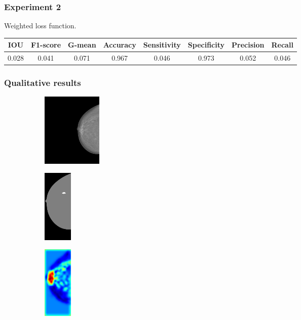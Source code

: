 \documentclass{beamer}
\begin{document}
	\begin{frame}
		\frametitle{Experiment 2}
		Weighted loss function.
		
		\scriptsize
		\begin{table}[h]
			\centering
			\begin{tabular}{cccccccc}
			\hline
			\textbf{IOU}	& \textbf{F1-score}	& \textbf{G-mean} &\textbf{Accuracy}	& \textbf{Sensitivity} & \textbf{Specificity} & \textbf{Precision} & \textbf{Recall}\\
			\hline
			 0.028 & 0.041 & 0.071 & 0.967 & 0.046 & 0.973 & 0.052 & 0.046\\
			\hline
			\end{tabular}
		\end{table}
	\end{frame}
	
	\begin{frame}
		\frametitle{Qualitative results}
		\begin{figure}[h]
		\centering
			\begin{subfigure}{0.25\textwidth}
				\centering
					\includegraphics[height=3.5cm]{plots/mammogram_ex1.png}
			\end{subfigure}
			\begin{subfigure}{0.16\textwidth}
				\centering
					\includegraphics[height=3.5cm]{plots/label_ex1.png}
			\end{subfigure}
			\begin{subfigure}{0.17\textwidth}
				\centering
					\includegraphics[height=3.5cm]{plots/logits_ex1_v2.png}

\end{subfigure}
\end{figure}
\end{frame}
\end{document}
